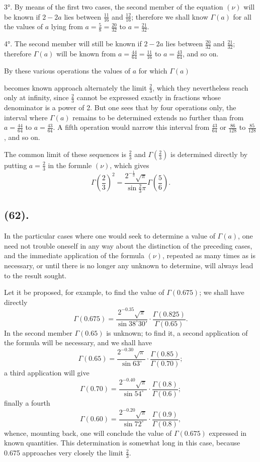 \documentclass{article}
\begin{document}
3°. By means of the first two cases, the second member of the equation $(\nu)$ will be known if $2-2a$ lies between $\frac{11}{16}$ and $\frac{12}{16}$; therefore we shall know $\Gamma(a)$ for all the values of $a$ lying from $a=\frac{5}{8}=\frac{20}{32}$ to $a=\frac{21}{32}$.

4°. The second member will still be known if $2-2a$ lies between $\frac{20}{32}$ and $\frac{21}{32}$; therefore $\Gamma(a)$ will be known from $a=\frac{44}{64}=\frac{11}{16}$ to $a=\frac{43}{64}$, and so on.

By these various operations the values of $a$ for which $\Gamma(a)$

becomes known approach alternately the limit $\frac{2}{3}$, which they nevertheless reach only at infinity, since $\frac{2}{3}$ cannot be expressed exactly in fractions whose denominator is a power of 2. But one sees that by four operations only, the interval where $\Gamma(a)$ remains to be determined extends no further than from $a=\frac{44}{64}$ to $a=\frac{43}{64}$. A fifth operation would narrow this interval from $\frac{43}{64}$ or $\frac{86}{128}$ to $\frac{85}{128}$, and so on.

The common limit of these sequences is $\frac{2}{3}$ and $\Gamma\left(\frac{2}{3}\right)$ is determined directly by putting $a=\frac{2}{3}$ in the formnle $(\nu)$, which gives
\[ \Gamma\left(\frac{2}{3}\right)^{2}=\frac{2^{-\frac{1}{3}}\sqrt{\pi}}{\sin\frac{2}{3}\pi}\Gamma\left(\frac{5}{6}\right). \]

\subsection*{(62).}

In the particular cases where one would seek to determine a value of $\Gamma(a)$, one need not trouble oneself in any way about the distinction of the preceding cases, and the immediate application of the formula $(\nu)$, repeated as many times as is necessary, or until there is no longer any unknown to determine, will always lead to the result sought.

Let it be proposed, for example, to find the value of $\Gamma(0.675)$; we shall have directly
\[ \Gamma(0.675)=\frac{2^{-0.35}\sqrt{\pi}}{\sin 38^{\circ}30'}\cdot\frac{\Gamma(0.825)}{\Gamma(0.65)}. \]
In the second member $\Gamma(0.65)$ is unknown; to find it, a second application of the formula will be necessary, and we shall have
\[ \Gamma(0.65)=\frac{2^{-0.30}\sqrt{\pi}}{\sin 63^{\circ}}\cdot\frac{\Gamma(0.85)}{\Gamma(0.70)}; \]
a third application will give
\[ \Gamma(0.70)=\frac{2^{-0.40}\sqrt{\pi}}{\sin 54^{\circ}}\cdot\frac{\Gamma(0.8)}{\Gamma(0.6)}; \]
finally a fourth
\[ \Gamma(0.60)=\frac{2^{-0.20}\sqrt{\pi}}{\sin 72^{\circ}}\cdot\frac{\Gamma(0.9)}{\Gamma(0.8)}, \]
whence, mounting back, one will conclude the value of $\Gamma(0.675)$ expressed in known quantities. This determination is somewhat long in this case, because 0.675 approaches very closely the limit $\frac{2}{3}$.
\end{document}
